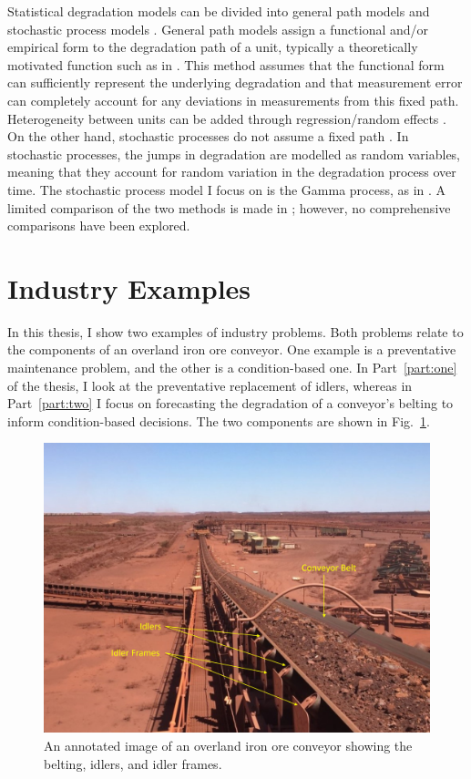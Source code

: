 Statistical degradation models can be divided into general path models and stochastic process models \citep{pandey2006, si2011}. General path models assign a functional and/or empirical form to the degradation path of a unit, typically a theoretically motivated function such as in \citet{robinson2000}. This method assumes that the functional form can sufficiently represent the underlying degradation and that measurement error can completely account for any deviations in measurements from this fixed path. Heterogeneity between units can be added through regression/random effects \citep{robinson2000}. On the other hand, stochastic processes do not assume a fixed path \citep{pandey2006}. In stochastic processes, the jumps in degradation are modelled as random variables, meaning that they account for random variation in the degradation process over time. The stochastic process model I focus on is the Gamma process, as in \citet{lawless2004}. A limited comparison of the two methods is made in \citet{ye2015}; however, no comprehensive comparisons have been explored.

\section{Industry Examples}
\label{sec:industry-data}

In this thesis, I show two examples of industry problems. Both problems relate to the components of an overland iron ore conveyor. One example is a preventative maintenance problem, and the other is a condition-based one. In Part~\ref{part:one} of the thesis, I look at the preventative replacement of idlers, whereas in Part~\ref{part:two} I focus on forecasting the degradation of a conveyor's belting to inform condition-based decisions. The two components are shown in Fig.~\ref{fig:belt_and_frame}.

\begin{figure}
  \centering
  \includegraphics[width=1\textwidth]{./figures/ch-1/cvr_example_edit_annotation.jpg}
  \caption{An annotated image of an overland iron ore conveyor \citep{australianmining2020} showing the belting, idlers, and idler frames.}
  \label{fig:belt_and_frame}
\end{figure}

